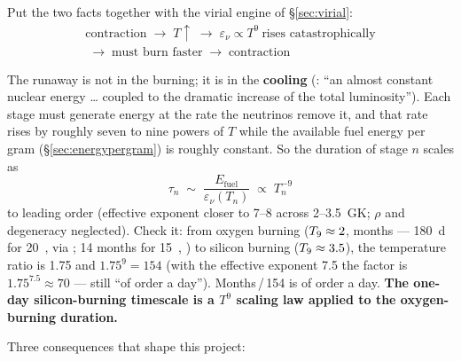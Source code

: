 Put the two facts together with the virial engine of \S\ref{sec:virial}:
%
\begin{equation}
\begin{gathered}
\text{contraction}
\;\longrightarrow\; T\uparrow
\;\longrightarrow\; \varepsilon_\nu \propto T^{9}\ \text{rises catastrophically}\\[2pt]
\;\longrightarrow\; \text{must burn faster}
\;\longrightarrow\; \text{contraction}
\end{gathered}
\label{eq:coolingrunaway}
\end{equation}

The runaway is not in the burning; it is in the \textbf{cooling}
(\citealt{limongi2017}: ``an almost constant nuclear energy \ldots{} coupled to
the dramatic increase of the total luminosity''). Each stage must generate
energy at the rate the neutrinos remove it, and that rate rises by roughly seven
to nine powers of $T$ while the available fuel energy per gram
(\S\ref{sec:energypergram}) is roughly constant. So the duration of stage $n$
scales as
%
\begin{equation}
\tau_n \;\sim\; \frac{E_{\mathrm{fuel}}}{\varepsilon_\nu(T_n)} \;\propto\; T_n^{-9}
\label{eq:stageduration}
\end{equation}
%
to leading order (effective exponent closer to 7--8 across 2--3.5~GK; $\rho$
and degeneracy neglected). Check it: from oxygen burning ($T_{9} \approx 2$,
months --- 180~d for 20~\Msun, \citealt{arnett1989} via
\citealt{odrzywolek2004}; 14 months for 15~\Msun, \citealt{kato2020}) to silicon
burning ($T_{9} \approx 3.5$), the temperature ratio is 1.75 and $1.75^9 = 154$
(with the effective exponent 7.5 the factor is $1.75^{7.5} \approx 70$ --- still
``of order a day''). Months\,/\,154 is of order a day. \textbf{The one-day
silicon-burning timescale is a $T^9$ scaling law applied to the oxygen-burning
duration.} 

Three consequences that shape this project:

